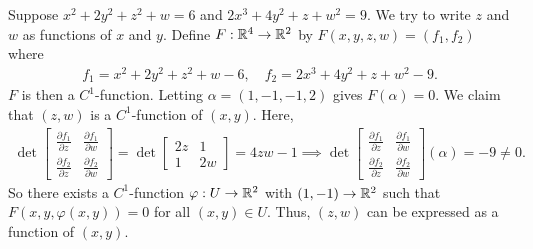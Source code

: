 \begin{example}
    Suppose $x^{2}+2y^{2}+z^{2}+w = 6$ and $2x^{3}+4y^{2}+z+w^{2} = 9$. We try to write $z$ and $w$ as functions of $x$ and $y$. Define $F:\mathbb{R}^{4} \to \mathbb{R}^{2}$ by $F(x,y,z,w) = (f_{1},f_{2})$ where
    \begin{align}
        f_{1} = x^{2}+2y^{2}+z^{2}+w-6,\quad f_{2} = 2x^{3}+4y^{2}+z+w^{2}-9.
    \end{align}
    $F$ is then a $C^{1}$-function. Letting $\alpha = (1,-1,-1,2)$ gives $F(\alpha) = 0$. We claim that $(z,w)$ is a $C^{1}$-function of $(x,y)$. Here,
    \begin{align}
        \det \begin{bmatrix}
            \frac{\partial f_{1}}{\partial z} & \frac{\partial f_{1}}{\partial w} \\
            \frac{\partial f_{2}}{\partial z} & \frac{\partial f_{2}}{\partial w}
        \end{bmatrix} = \det \begin{bmatrix}
            2z & 1 \\
            1 & 2w
        \end{bmatrix} = 4zw - 1 \implies \det \begin{bmatrix}
            \frac{\partial f_{1}}{\partial z} & \frac{\partial f_{1}}{\partial w} \\
            \frac{\partial f_{2}}{\partial z} & \frac{\partial f_{2}}{\partial w}
        \end{bmatrix}(\alpha) = -9 \neq 0.
    \end{align}
    So there exists a $C^{1}$-function $\varphi:U \to \mathbb{R}^{2}$ with $(1,-1) \to \mathbb{R}^{2}$ such that $F(x,y,\varphi(x,y)) = 0$ for all $(x,y) \in U$. Thus, $(z,w)$ can be expressed as a function of $(x,y)$.
\end{example}